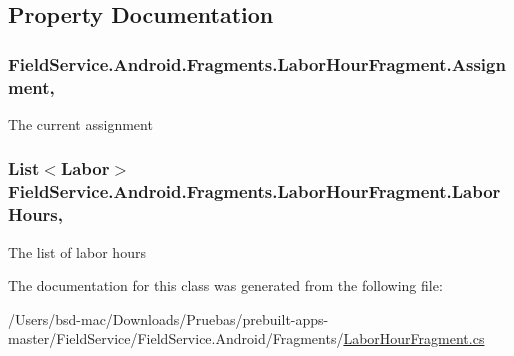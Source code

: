 \subsection{Property Documentation}
\hypertarget{class_field_service_1_1_android_1_1_fragments_1_1_labor_hour_fragment_a49baef3a7993fa89b08cfb30363a3b33}{
\subsubsection[{Assignment}]{ Field\+Service.\+Android.\+Fragments.\+Labor\+Hour\+Fragment.\+Assignment\hspace{0.3cm}{\ttfamily [get]}, {\ttfamily [set]}}}\label{class_field_service_1_1_android_1_1_fragments_1_1_labor_hour_fragment_a49baef3a7993fa89b08cfb30363a3b33}


The current assignment 

\hypertarget{class_field_service_1_1_android_1_1_fragments_1_1_labor_hour_fragment_a19d1a9881ed77b524b4cb1c86fde0e91}{
\subsubsection[{Labor\+Hours}]{\setlength{\rightskip}{0pt plus 5cm}List$<${\bf Labor}$>$ Field\+Service.\+Android.\+Fragments.\+Labor\+Hour\+Fragment.\+Labor\+Hours\hspace{0.3cm}{\ttfamily [get]}, {\ttfamily [set]}}}\label{class_field_service_1_1_android_1_1_fragments_1_1_labor_hour_fragment_a19d1a9881ed77b524b4cb1c86fde0e91}


The list of labor hours 



The documentation for this class was generated from the following file\+:\begin{DoxyCompactItemize}
\item 
/\+Users/bsd-\/mac/\+Downloads/\+Pruebas/prebuilt-\/apps-\/master/\+Field\+Service/\+Field\+Service.\+Android/\+Fragments/\hyperlink{_labor_hour_fragment_8cs}{Labor\+Hour\+Fragment.\+cs}\end{DoxyCompactItemize}

